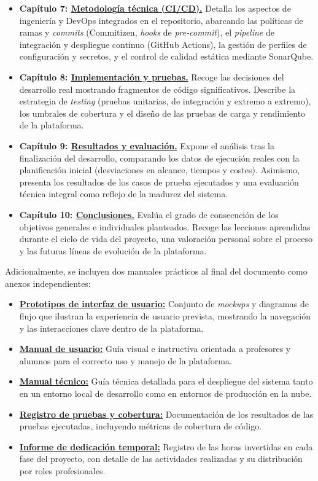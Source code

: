 \begin{itemize}
    \item \textbf{Capítulo 7: \hyperref[cap:metodologia_tecnica]{Metodología técnica (CI/CD).}} Detalla los aspectos de ingeniería y DevOps integrados en el repositorio, abarcando las políticas de ramas y \textit{commits} (Commitizen, \textit{hooks} de \textit{pre-commit}), el \textit{pipeline} de integración y despliegue continuo (GitHub Actions), la gestión de perfiles de configuración y secretos, y el control de calidad estática mediante SonarQube.
    \item \textbf{Capítulo 8: \hyperref[cap:implementacion_y_pruebas]{Implementación y pruebas.}} Recoge las decisiones del desarrollo real mostrando fragmentos de código significativos. Describe la estrategia de \textit{testing} (pruebas unitarias, de integración y extremo a extremo), los umbrales de cobertura y el diseño de las pruebas de carga y rendimiento de la plataforma.
    \item \textbf{Capítulo 9: \hyperref[cap:resultados_y_evaluacion]{Resultados y evaluación.}} Expone el análisis tras la finalización del desarrollo, comparando los datos de ejecución reales con la planificación inicial (desviaciones en alcance, tiempos y costes). Asimismo, presenta los resultados de los casos de prueba ejecutados y una evaluación técnica integral como reflejo de la madurez del sistema.
    \item \textbf{Capítulo 10: \hyperref[cap:conclusiones]{Conclusiones.}} Evalúa el grado de consecución de los objetivos generales e individuales planteados. Recoge las lecciones aprendidas durante el ciclo de vida del proyecto, una valoración personal sobre el proceso y las futuras líneas de evolución de la plataforma.
\end{itemize}

Adicionalmente, se incluyen dos manuales prácticos al final del documento como anexos independientes:
\begin{itemize}
    \item \textbf{\hyperref[anexo:prototipos_interfaz_usuario]{Prototipos de interfaz de usuario:}} Conjunto de \textit{mockups} y diagramas de flujo que ilustran la experiencia de usuario prevista, mostrando la navegación y las interacciones clave dentro de la plataforma.
    \item \textbf{\hyperref[anexo:manual_de_usuario]{Manual de usuario:}} Guía visual e instructiva orientada a profesores y alumnos para el correcto uso y manejo de la plataforma.
    \item \textbf{\hyperref[anexo:manual_tecnico]{Manual técnico:}} Guía técnica detallada para el despliegue del sistema tanto en un entorno local de desarrollo como en entornos de producción en la nube.    
    \item \textbf{\hyperref[anexo:registro_pruebas_cobertura]{Registro de pruebas y cobertura:}} Documentación de los resultados de las pruebas ejecutadas, incluyendo métricas de cobertura de código.
\item \textbf{\hyperref[anexo:clockify]{Informe de dedicación temporal:}} Registro de las horas invertidas en cada fase del proyecto, con detalle de las actividades realizadas y su distribución por roles profesionales.
\end{itemize}
